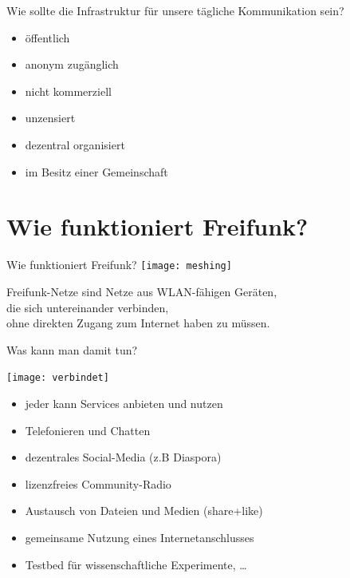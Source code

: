 \documentclass{beamer}
\begin{document}


\begin{frame}{Wie sollte die Infrastruktur für unsere tägliche Kommunikation sein?}
\vfill
\begin{itemize}
\pause\item öffentlich
\pause\item anonym zugänglich
\pause\item nicht kommerziell
\pause\item unzensiert
\pause\item dezentral organisiert
\pause\item im Besitz einer Gemeinschaft
\end{itemize}
\vfill
\end{frame}


\section{Wie funktioniert Freifunk?}
\begin{frame}{Wie funktioniert Freifunk?}
\vfill
\centering
\texttt{[image: meshing]}

Freifunk-Netze sind Netze aus WLAN-fähigen Geräten,\\ die sich untereinander verbinden,\\ ohne direkten Zugang zum Internet haben zu müssen.
\vfill
\end{frame}

\begin{frame}{Was kann man damit tun?}
\vfill
\begin{center}
\texttt{[image: verbindet]}
\end{center}

\begin{itemize}
\pause\item jeder kann Services anbieten und nutzen
\pause\item Telefonieren und Chatten
\pause\item dezentrales Social-Media (z.B Diaspora)
\pause\item lizenzfreies Community-Radio
\pause\item Austausch von Dateien und Medien (share+like)
\pause\item gemeinsame Nutzung eines Internetanschlusses
\pause\item Testbed f\"ur wissenschaftliche Experimente, \ldots
\end{itemize}
\vfill
\end{frame}
\end{document}
